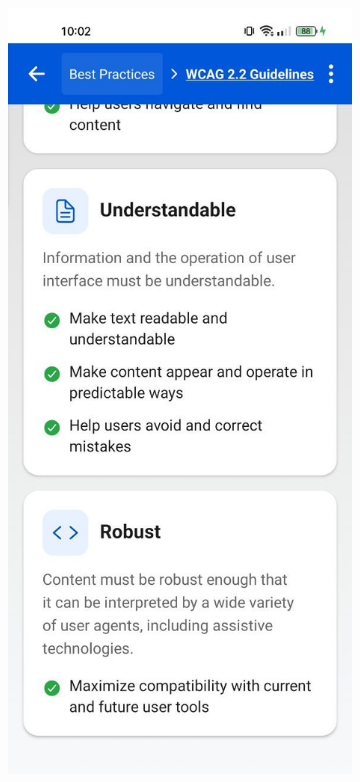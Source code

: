 \begin{figure}[ht]
    \centering
    \begin{subfigure}[b]{0.48\textwidth}
        \centering
        \includegraphics[width=\linewidth, alt={First part of the Semantic structure screen}]{img/semantics1.jpg}

\end{subfigure}
\end{figure}
